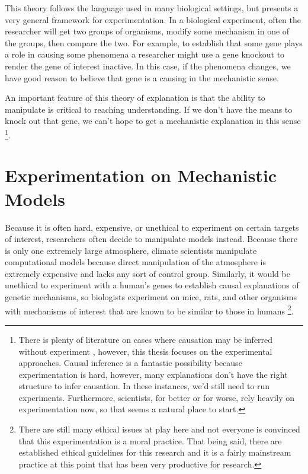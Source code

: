 This theory follows the language used in many biological settings, but
presents a very general framework for experimentation. In a biological
experiment, often the researcher will get two groups of organisms,
modify some mechanism in one of the groups, then compare the two. For
example, to establish that some gene plays a role in causing some
phenomena a researcher might use a gene knockout to render the gene of
interest inactive. In this case, if the phenomena changes, we have good
reason to believe that gene is a causing in the mechanistic sense.

An important feature of this theory of explanation is that the ability
to manipulate is critical to reaching understanding. If we don't have
the means to knock out that gene, we can't hope to get a mechanistic
explanation in this sense \footnote{There is plenty of literature on
  cases where causation may be inferred without experiment
  \autocite{hitchcockCausalModels2019}, however, this thesis focuses on
  the experimental approaches. Causal inference is a fantastic
  possibility because experimentation is hard, however, many
  explanations don't have the right structure to infer causation. In
  these instances, we'd still need to run experiments. Furthermore,
  scientists, for better or for worse, rely heavily on experimentation
  now, so that seems a natural place to start.}.

\hypertarget{experimentation-on-mechanistic-models}{%
\section{Experimentation on Mechanistic
Models}\label{experimentation-on-mechanistic-models}}

Because it is often hard, expensive, or unethical to experiment on
certain targets of interest, researchers often decide to manipulate
models instead. Because there is only one extremely large atmosphere,
climate scientists manipulate computational models because direct
manipulation of the atmosphere is extremely expensive and lacks any sort
of control group. Similarly, it would be unethical to experiment with a
human's genes to establish causal explanations of genetic mechanisms, so
biologists experiment on mice, rats, and other organisms with mechanisms
of interest that are known to be similar to those in humans \footnote{There
  are still many ethical issues at play here and not everyone is
  convinced that this experimentation is a moral practice. That being
  said, there are established ethical guidelines for this research and
  it is a fairly mainstream practice at this point that has been very
  productive for research.}.

